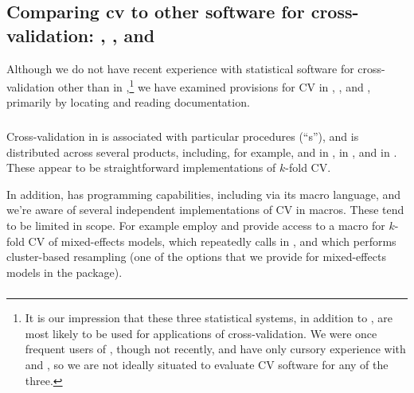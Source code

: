 \documentclass[
]{jss}
\begin{document}
\subsection[Comparing cv to other software for cross-validation: SAS,
Stata, and Python]
{Comparing cv to other software for cross-validation: ,
, and }
\label{comparing-cv-to-other-software-for-cross-validation-sas-stata-and-python}

Although we do not have recent experience with statistical software for
cross-validation other than in ,\footnote{It is our
  impression that these three statistical systems, in addition to
  , are most likely to be used for applications of
  cross-validation. We were once frequent users of ,
  though not recently, and have only cursory experience with
   and , so we are not ideally situated
  to evaluate CV software for any of the three.} we have examined
provisions for CV in , , and
, primarily by locating and reading documentation.

\subsubsection[SAS]{}\label{sas}

Cross-validation in  is associated with particular
procedures (``s''), and is distributed across several
products, including, for example,  and
 in  \citep{SAS-Stat:2020}, in
 \citep{SAS-Enterprise-Miner:2018}, and
in 
\citep{SAS-Visual-Data-Mining:2020}. These appear to be straightforward
implementations of \(k\)-fold CV.

In addition,  has programming capabilities, including via
its macro language, and we're aware of several independent
implementations of CV in  macros. These tend to be limited
in scope. For example \citet{Slaets-et-al:2014} employ and provide
access to a  macro for \(k\)-fold CV of mixed-effects
models, which repeatedly calls  in ,
and which performs cluster-based resampling (one of the options that we
provide for mixed-effects models in the  package).

\subsubsection[Stata]{}\label{stata}
\end{document}
